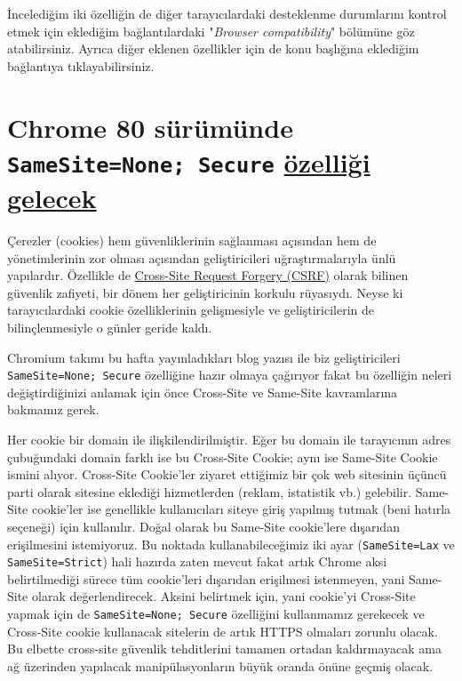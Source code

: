 \documentclass[11pt]{article}
\begin{document}
İncelediğim iki özelliğin de diğer tarayıcılardaki desteklenme durumlarını
kontrol etmek için eklediğim bağlantılardaki "\emph{Browser compatibility}"
bölümüne göz atabilirsiniz. Ayrıca diğer eklenen özellikler için de konu
başlığına eklediğim bağlantıya tıklayabilirsiniz.
\section{Chrome 80 sürümünde \texttt{SameSite=None; Secure} \href{https://blog.chromium.org/2019/10/developers-get-ready-for-new.html?m=1}{özelliği gelecek}}
\label{sec:orgf0a37c2}
Çerezler (cookies) hem güvenliklerinin sağlanması açısından hem de
yönetimlerinin zor olması açısından geliştiricileri uğraştırmalarıyla ünlü
yapılardır. Özellikle de \href{https://cheatsheetseries.owasp.org/cheatsheets/Cross-Site\_Request\_Forgery\_Prevention\_Cheat\_Sheet.html}{Cross-Site Request Forgery (CSRF)} olarak bilinen
güvenlik zafiyeti, bir dönem her geliştiricinin korkulu rüyasıydı. Neyse ki
tarayıcılardaki cookie özelliklerinin gelişmesiyle ve geliştiricilerin de
bilinçlenmesiyle o günler geride kaldı.

Chromium takımı bu hafta yayınladıkları blog yazısı ile biz geliştiricileri
\texttt{SameSite=None; Secure} özelliğine hazır olmaya çağırıyor fakat bu özelliğin
neleri değiştirdiğinizi anlamak için önce Cross-Site ve Same-Site kavramlarına
bakmamız gerek.

Her cookie bir domain ile ilişkilendirilmiştir. Eğer bu domain ile tarayıcının
adres çubuğundaki domain farklı ise bu Cross-Site Cookie; aynı ise Same-Site
Cookie ismini alıyor. Cross-Site Cookie'ler ziyaret ettiğimiz bir çok web
sitesinin üçüncü parti olarak sitesine eklediği hizmetlerden (reklam,
istatistik vb.) gelebilir. Same-Site cookie'ler ise genellikle kullanıcıları
siteye giriş yapılmış tutmak (beni hatırla seçeneği) için kullanılır. Doğal
olarak bu Same-Site cookie'lere dışarıdan erişilmesini istemiyoruz. Bu noktada
kullanabileceğimiz iki ayar (\texttt{SameSite=Lax} ve \texttt{SameSite=Strict}) hali hazırda
zaten mevcut fakat artık Chrome aksi belirtilmediği sürece tüm cookie'leri
dışarıdan erişilmesi istenmeyen, yani Same-Site olarak değerlendirecek. Aksini
belirtmek için, yani cookie'yi Cross-Site yapmak için de \texttt{SameSite=None;
	Secure} özelliğini kullanmamız gerekecek ve Cross-Site cookie kullanacak
sitelerin de artık HTTPS olmaları zorunlu olacak. Bu elbette cross-site
güvenlik tehditlerini tamamen ortadan kaldırmayacak ama ağ üzerinden yapılacak
manipülasyonların büyük oranda önüne geçmiş olacak.
\end{document}
